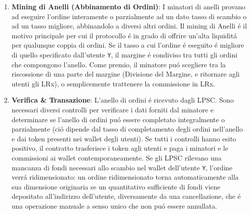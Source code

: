 \documentclass[UTF8,nofonts]{article}
\makeatletter
\newenvironment{figurehere}
 {\def\@captype{figure}}
 {}
\makeatother
\begin{document}
\begin{multicols}{2}
\begin{enumerate}
\begin{center}
\begin{figurehere}

\caption{Processo di Scambio Loopring}
\label{fig:process}
\end{figurehere}
\end{center}



\item \textbf{Mining di Anelli (Abbinamento di Ordini)}: I minatori di anelli provano ad eseguire l'ordine interamente o parzialmente ad un dato tasso di scambio o ad un tasso migliore, abbinandolo a diversi altri ordini. Il mining di Anelli \'e il motivo principale per cui il protocollo \'e in grado di offrire un'alta liquidit\'a per qualunque coppia di ordini. Se il tasso a cui l'ordine \'e eseguito \'e migliore di quello specificato dall'utente \verb|Y|, il margine \'e condiviso tra tutti gli ordini che compongono l'anello. Come premio, il minatore pu\'o scegliere tra la riscossione di una parte del margine (Divisione del Margine, e ritornare agli utenti gli LRx), o semplicemente trattenere la commissione in LRx.


\item \textbf{Verifica \& Transazione}: L'anello di ordini \'e ricevuto dagli LPSC. Sono necessari diversi controlli per verificare i dati forniti dal minatore e determinare se l'anello di ordini pu\'o essere completato integralmente o parzialmente (ci\'o dipende dal tasso di completamento degli ordini nell'anello e dai token presenti nei wallet degli utenti). Se tutti i controlli hanno esito positivo, il contratto trasferisce i token agli utenti e paga i minatori e le commissioni ai wallet contemporaneamente. Se gli LPSC rilevano una mancanza di fondi necessari allo scambio nel wallet dell'utente \verb|Y|, l'ordine verr\'a ridimensionato: un ordine ridimensionato torna automaticamente alla sua dimensione originaria se un quantitativo sufficiente di fondi viene depositato all'indirizzo dell'utente, diversamente da una cancellazione, che \'e una operazione manuale a senso unico che non pu\'o essere annullata.


\end{enumerate}





%
%
%


\end{multicols}
\end{document}
